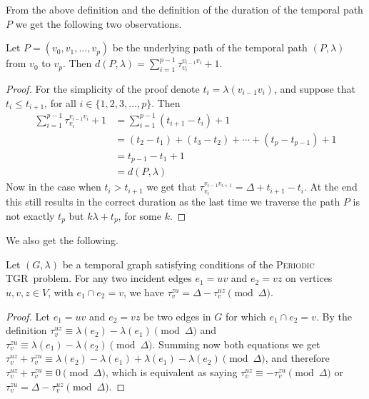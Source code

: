\documentclass[a4paper,UKenglish,cleveref, autoref, thm-restate]{lipics-v2021}
\newcommand{\deltaExact}{\textsc{Periodic TGR}}
\begin{document}
    From the above definition and the definition of the duration of the temporal path $P$ we get the following two observations.
    \begin{observation}\label{obs:durationPwithWaitingTimes}
        Let $P = (v_0, v_1, \dots, v_p)$ be the underlying path of the temporal path
        $(P, \lambda)$ from $v_0$ to $v_p$.
        Then $d(P,\lambda) = \sum_{i = 1}^{p-1} \tau_{v_i}^{v_{i-1}v_i} + 1 $.
    \end{observation}
    \begin{proof}
        For the simplicity of the proof denote $t_i = \lambda(v_{i-1}v_i)$, and suppose that $t_i \leq t_{i+1}$, for all $i \in \{1,2,3,\dots,p\}$.
        Then
        \begin{align*}
        \sum_{i = 1}^{p-1} \tau_{v_i}^{v_{i-1}v_i} + 1  
        &= \sum _{i = 1}^{p-1} (t_{i+1} - t_i) + 1 \\
        & = (t_2 - t_1) + (t_3 - t_2) + \cdots + (t_p - t_{p-1}) + 1  \\
        & = t_{p-1} - t_1 + 1\\
        & = d(P, \lambda)
        \end{align*}
        Now in the case when $t_i > t_{i+1}$ we get that $\tau_{v_i}^{v_{i-1}v_{i+1}} = \Delta + t_{i+1} - t_i$.
        At the end this still results in the correct duration as the last time we traverse the path $P$ is not exactly $t_p$ but $k \lambda + t_p$, for some $k$.
    \end{proof}
    We also get the following.
    \begin{observation}\label{obs:travel-delays-both-directions}
    Let $(G, \lambda)$ be a temporal graph satisfying conditions of the \deltaExact\ problem.
    For any two incident edges $e_1 = uv$ and $e_2 = vz$ on vertices $u,v,z \in V$, with $e_1 \cap e_2 = v$, we have $\tau_v^{zu} = \Delta - \tau_v^{uz} \pmod \Delta$.
    \end{observation}
    
    \begin{proof}
        Let $e_1 = uv$ and $e_2 = vz$ be two edges in $G$ for which $e_1 \cap e_2 = v$. 
        By the definition $\tau_v^{uz} \equiv \lambda (e_2) - \lambda(e_1) \pmod \Delta$ and $\tau_v^{zu} \equiv \lambda (e_1) - \lambda(e_2) \pmod \Delta$.
        Summing now both equations we get $\tau_v^{uz} + \tau_v^{zu} \equiv \lambda(e_2) - \lambda(e_1) + \lambda (e_1) - \lambda(e_2) \pmod \Delta$, and therefore $\tau_v^{uz} + \tau_v^{zu} \equiv 0 \pmod \Delta$, which is equivalent as saying $\tau_v^{uz} \equiv - \tau_v^{zu} \pmod \Delta$ or $\tau_v^{zu} = \Delta - \tau_v^{uz} \pmod \Delta$.
    \end{proof}
\end{document}
